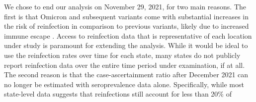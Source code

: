 We chose to end our analysis on November 29, 2021, for two main reasons. The
first is that Omicron and subsequent variants come with substantial increases in
the risk of reinfection in comparison to previous variants, likely due to
increased immune escape \citep{wei2024risk, pulliam2022increased,
eythorsson2022rate}. Access to reinfection data that is representative of each
location under study is paramount for extending the analysis. While it would be
ideal to use the reinfection rates over time for each \US state, many states do
not publicly report reinfection data over the entire time period under
examination, if at all.
%
The second reason is that the case-ascertainment ratio after December 2021 can
no longer be estimated with seroprevalence data alone. Specifically, while most
state-level data suggests that reinfections still account for less than 20\% of
